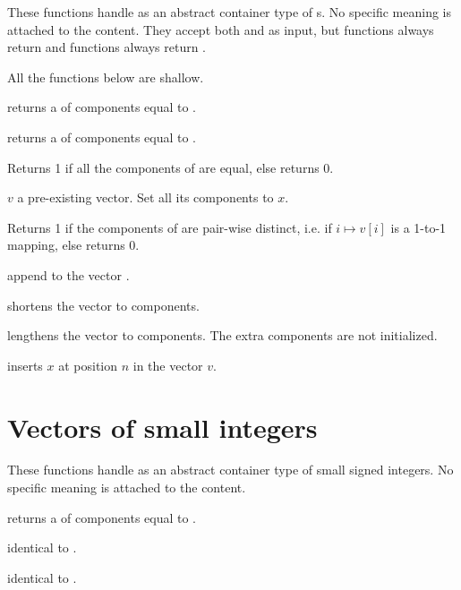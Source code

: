 
These functions handle  as an abstract container type of
s. No specific meaning is attached to the content. They accept both
 and  as input, but  functions always return
 and  functions always return .

 All the functions below are shallow.

 returns a  of  components
equal to .

 returns a  of  components
equal to .

 Returns 1 if all the components of  are
equal, else returns 0.

 $v$ a pre-existing vector. Set all its
components to $x$.

  Returns 1 if the components of  are
pair-wise distinct, i.e. if $i\mapsto v[i]$ is a 1-to-1 mapping, else returns
0.

 append  to the vector .

 shortens the vector  to 
components.

 lengthens the vector 
to  components. The extra components are not initialized.

 inserts $x$ at position $n$ in the vector
$v$.

\section{Vectors of small integers}


These functions handle  as an abstract container type
of small signed integers. No specific meaning is attached to the content.

 returns a 
of  components equal to .

 identical to .

 identical to .

